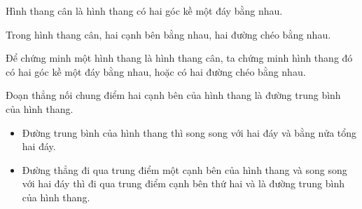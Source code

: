 \begin{dn}
Hình thang cân là hình thang có hai góc kề một đáy bằng nhau. 
\end{dn}

\begin{tc}
Trong hình thang cân, hai cạnh bên bằng nhau, hai đường chéo bằng nhau. 
\end{tc}

\begin{note}
Để chứng minh một hình thang là hình thang cân, ta chứng minh hình thang đó có hai góc kề một đáy bằng nhau, hoặc có hai đường chéo bằng nhau.
\end{note}

\begin{dn}
Đoạn thẳng nối chung điểm hai cạnh bên của hình thang là đường trung bình của hình thang.
\end{dn}

\begin{tc}
\begin{itemize}
\item Đường trung bình của hình thang thì song song với hai đáy và bằng nửa tổng hai đáy. 
\item Đường thẳng đi qua trung điểm một cạnh bên của hình thang và song song với hai đáy thì đi qua trung điểm cạnh bên thứ hai và là đường trung bình của hình thang.
\end{itemize}
\end{tc}

